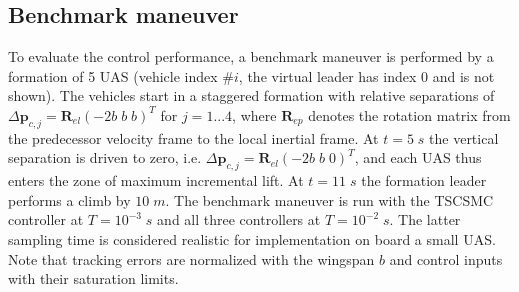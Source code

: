 \documentclass{ifacconf}
\providecommand{\mbf}[1]{\mathbf{#1}}
\newcommand{\idxFollower}{{\ensuremath{i} }}
\newcommand{\idxPredecessor}{{\ensuremath{i-1} }}
\begin{document}
\subsection{{Benchmark maneuver}}
To evaluate the control performance, a benchmark maneuver is performed by a formation of 5 UAS (vehicle index $\#\idxFollower$, the virtual leader has index 0 and is not shown). The vehicles start in a staggered formation with relative separations of $\Delta \mbf{p}_{c,j} = \mbf{R}_{el} (-2b \; b \; b)^T$ for $j=1...4$, where $\mbf{R}_{ep}$ denotes the rotation matrix from the predecessor velocity frame to the local inertial frame. At $t=5 \; s$ the vertical separation is driven to zero, i.e. $\Delta \mbf{p}_{c,j} = \mbf{R}_{el}(-2b \; b \; 0)^T$, and each UAS thus enters the zone of maximum incremental lift. 
At $t=11 \;s$ the formation leader performs a climb by $10 \; m$. %
The benchmark maneuver is run with the TSCSMC controller at $T=10^{-3} \; s$ and all three controllers at $T=10^{-2} \; s$. The latter sampling time is considered realistic for implementation on board a small UAS. Note that tracking errors are normalized with the wingspan $b$ and control inputs with their saturation limits.\\
\end{document}

